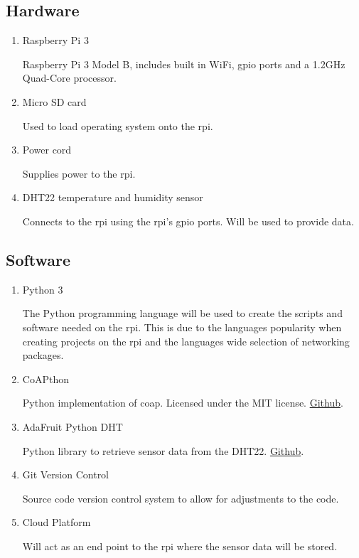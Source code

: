 \subsection{Hardware}
\begin{enumerate}
    \item Raspberry Pi 3

        Raspberry Pi 3 Model B, includes built in WiFi, \gls{gpio} ports and a 1.2GHz Quad-Core processor.
    \item Micro SD card
    
        Used to load operating system onto the \gls{rpi}.
    \item Power cord
    
        Supplies power to the \gls{rpi}.
    \item DHT22 temperature and humidity sensor
    
        Connects to the \gls{rpi} using the \gls{rpi}'s \gls{gpio} ports. Will be used to provide data.

\end{enumerate}

\subsection{Software}
\begin{enumerate}
    \item Python 3

        The Python programming language will be used to create the scripts and software needed on the \gls{rpi}.
        This is due to the languages popularity when creating projects on the \gls{rpi} and the languages wide selection
        of networking packages.
    \item CoAPthon
    
        Python implementation of \gls{coap}. Licensed under the MIT license. \href{https://github.com/Tanganelli/CoAPthon}{Github}.

    \item AdaFruit Python DHT
        
        Python library to retrieve sensor data from the DHT22. \href{https://github.com/adafruit/Adafruit_Python_DHT}{Github}.

    \item Git Version Control
    
        Source code version control system to allow for adjustments to the code.

    \item Cloud Platform
    
        Will act as an end point to the \gls{rpi} where the sensor data will be stored.
\end{enumerate}